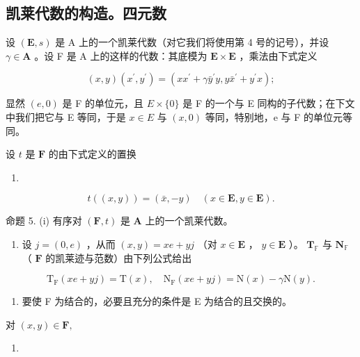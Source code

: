 \subsection{凯莱代数的构造。四元数}

设 \((\mathbf{E}, s)\) 是 A 上的一个凯莱代数（对它我们将使用第 4 号的记号），并设 \(\gamma \in \mathbf{A}\) 。设 F 是 A 上的这样的代数：其底模为 \(\mathbf{E} \times \mathbf{E}\) ，乘法由下式定义

\[
(x, y) (x ^ {\prime}, y ^ {\prime}) = (x x ^ {\prime} + \gamma \bar {y} ^ {\prime} y, y \bar {x} ^ {\prime} + y ^ {\prime} x);\tag{22}
\]

显然 \((e,0)\) 是 F 的单位元，且 \(E \times \{0\}\) 是 F 的一个与 E 同构的子代数；在下文中我们把它与 E 等同，于是 \(x \in E\) 与 \((x,0)\) 等同，特别地，e 与 F 的单位元等同。

设 \(t\) 是 \(\mathbf{F}\) 的由下式定义的置换

\begin{enumerate}
\def\labelenumi{(\arabic{enumi})}
\setcounter{enumi}{22}
\tightlist
\item
\end{enumerate}

\[
t ((x, y)) = (\bar {x}, - y) \quad (x \in \mathbf {E}, y \in \mathbf {E}).
\]

命题 5. (i) 有序对 \((\mathbf{F}, t)\) 是 \(\mathbf{A}\) 上的一个凯莱代数。

\begin{enumerate}
\def\labelenumi{(\roman{enumi})}
\setcounter{enumi}{1}
\tightlist
\item
  设 \(j = (0, e)\) ，从而 \((x, y) = xe + yj\) （对 \(x \in \mathbf{E}\) ， \(y \in \mathbf{E}\) ）。 \(\mathbf{T}_{\mathbb{F}}\) 与 \(\mathbf{N}_{\mathbb{F}}\) （ \(\mathbf{F}\) 的凯莱迹与范数）由下列公式给出
\end{enumerate}

\[
\mathrm{T} _ {\mathrm{F}} (x e + y j) = \mathrm{T} (x), \quad \mathrm{N} _ {\mathrm{F}} (x e + y j) = \mathrm{N} (x) - \gamma \mathrm{N} (y).\tag{24}
\]

\begin{enumerate}
\def\labelenumi{(\roman{enumi})}
\setcounter{enumi}{2}
\tightlist
\item
  要使 F 为结合的，必要且充分的条件是 E 为结合的且交换的。
\end{enumerate}

对 \((x,y)\in \mathbf{F},\)

\begin{enumerate}
\def\labelenumi{(\arabic{enumi})}
\setcounter{enumi}{24}
\tightlist
\item
\end{enumerate}

